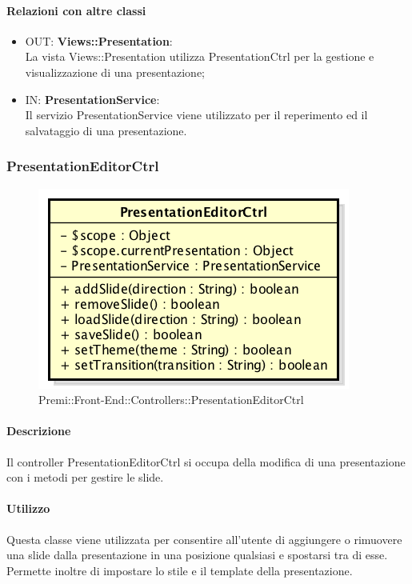 	\paragraph{Relazioni con altre classi}
	\begin{itemize}
	  \item OUT: \textbf{Views::Presentation}:\\
		La vista Views::Presentation utilizza PresentationCtrl per la gestione e visualizzazione di una presentazione;
	  \item IN: \textbf{PresentationService}: \\
	  	Il servizio PresentationService viene utilizzato per il reperimento ed il salvataggio di una presentazione.
	\end{itemize}

\newpage
\subsubsection{PresentationEditorCtrl}
\begin{figure}[h]
	\centering
	\includegraphics[width=0.5\linewidth]{img/premi_front_end_controllers_presentationeditorctrl}
	\caption[Premi::Front-End::Controllers::PresentationEditorCtrl]{Premi::Front-End::Controllers::PresentationEditorCtrl}
\end{figure}

	\paragraph{Descrizione}
	Il controller PresentationEditorCtrl si occupa della modifica di una presentazione con i metodi per gestire le slide.

	\paragraph{Utilizzo}
	Questa classe viene utilizzata per consentire all'utente di aggiungere o rimuovere una slide dalla presentazione in una posizione qualsiasi e spostarsi tra di esse. Permette inoltre di impostare lo stile e il template della presentazione.

